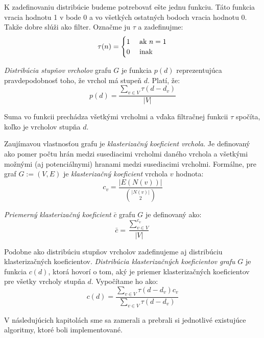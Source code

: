 K zadefinovaniu distribúcie budeme potrebovať ešte jednu funkciu. Táto funkcia 
vracia hodnotu 1 v bode 0 a vo všetkých ostatných bodoch vracia hodnotu 0. 
Takže dobre slúži ako filter. Označme ju $\tau$ a zadefinujme: 
$$\tau (n) = \begin{cases}
\hfill 1 \hfill & \text{ ak $n=1$} \\
\hfill 0 \hfill & \text{ inak} \\
\end{cases}$$

\emph{Distribúcia stupňov vrcholov} grafu $G$ je funkcia 
$p(d)$ reprezentujúca pravdepodobnosť toho, že vrchol má stupeň $d$. Platí, že: 
$$p(d) = \frac{\sum_{v \in V}^{}{\tau(d - d_v)}}{|V|}$$

Suma vo funkcii prechádza všetkými vrcholmi a vďaka filtračnej funkcii $\tau$ 
spočíta, koľko je vrcholov stupňa $d$.

Zaujímavou vlastnosťou grafu je \emph{klasterizačný koeficient vrchola}. Je 
definovaný ako pomer počtu hrán medzi susediacimi vrcholmi daného vrchola a 
všetkými možnými (aj potenciálnymi) hranami medzi susediacimi vrcholmi. 
Formálne, pre graf $G := (V, E)$ je \emph{klasterizačný koeficient} vrchola 
$v$ hodnota: $$c_v = \frac{|E(N(v))|}{{|N(v)| \choose 2}}$$

\emph{Priemerný klasterizačný koeficient} $\bar{c}$ grafu $G$ je definovaný ako:
$$\bar{c} = \frac{\sum_{v\in V}^{c_v}}{|V|}$$

Podobne ako distribúciu stupňov vrcholov zadefinujeme aj distribúciu 
klasterizačných koeficientov. \emph{Distribúcia klasterizačných koeficientov 
grafu} $G$ je funkcia $c(d)$, ktorá hovorí o tom, aký je priemer
klasterizačných koeficientov pre všetky vrcholy stupňa $d$. Vypočítame ho ako: 
$$c(d) = \frac{\sum_{v \in V}^{}{\tau(d - d_v)c_v}}
{\sum_{v \in V}^{}{\tau(d - d_v)}}$$


V následujúcich kapitolách sme sa zamerali a prebrali si jednotlivé existujúce 
algoritmy, ktoré boli implementované.

